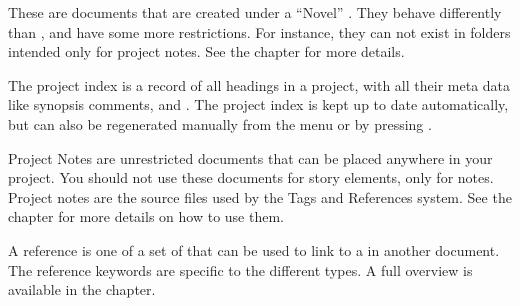 \documentclass[a4paper,11pt,english]{sphinxmanual}
\begin{document}
\begin{description}
\sphinxAtStartPar
These are documents that are created under a “Novel” {\hyperref[\detokenize{int_glossary:term-Root-Folder}]{}}. They behave
differently than {\hyperref[\detokenize{int_glossary:term-Project-Notes}]{}}, and have some more restrictions. For instance, they
can not exist in folders intended only for project notes. See the {\hyperref[\detokenize{project_structure:a-struct}]{}} chapter for
more details.

\sphinxAtStartPar
The project index is a record of all headings in a project, with all their meta data like
synopsis comments, {\hyperref[\detokenize{int_glossary:term-Tag}]{}} and {\hyperref[\detokenize{int_glossary:term-Reference}]{}}. The project index is
kept up to date automatically, but can also be regenerated manually from the
 menu or by pressing .

\sphinxAtStartPar
Project Notes are unrestricted documents that can be placed anywhere in your project. You
should not use these documents for story elements, only for notes. Project notes are the
source files used by the Tags and References system. See the {\hyperref[\detokenize{project_references:a-references}]{}} chapter for
more details on how to use them.

\sphinxAtStartPar
A reference is one of a set of {\hyperref[\detokenize{int_glossary:term-Keyword}]{}} that can be used to link to a
{\hyperref[\detokenize{int_glossary:term-Tag}]{}} in another document. The reference keywords are specific to the different
{\hyperref[\detokenize{int_glossary:term-Root-Folder}]{}} types. A full overview is available in the {\hyperref[\detokenize{project_references:a-references}]{}} chapter.


\end{description}
\end{document}
